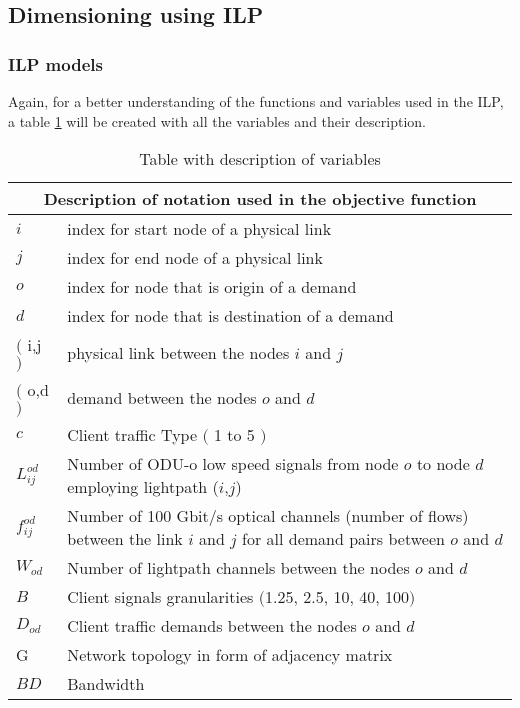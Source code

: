 \newpage
\subsection{Dimensioning using ILP}

\subsubsection{ILP models} \label{ILP_models_Transluc}

Again, for a better understanding of the functions and variables used in the ILP, a table \ref{description_transluc} will be created with all the variables and their description. \\

\begin{table}[h!]
\centering
\begin{tabular}{ |p{1cm}||p{13cm}|}
 \hline
 \multicolumn{2}{|c|}{Description of notation used in the objective function} \\
 \hline
 \hline
 $i$ & index for start node of a physical link \\
 $j$ & index for end node of a physical link \\
 $o$ & index for node that is origin of a demand \\
 $d$ & index for node that is destination of a demand \\
 $($ i,j $)$ & physical link between the nodes $i$ and $j$ \\
 $($ o,d $)$ & demand between the nodes $o$ and $d$ \\
 $c$ & Client traffic Type $($ 1 to 5 $)$ \\
 $L_{ij}^{od}$ & Number of ODU-o low speed signals from node $o$ to node $d$ employing lightpath ($i$,$j$) \\
 $f_{ij}^{od}$ & Number of 100 Gbit/s optical channels (number of flows) between the link $i$ and $j$ for all demand pairs between $o$ and $d$ \\
 $W_{od}$ & Number of lightpath channels between the nodes $o$ and $d$ \\
 $B$ & Client signals granularities $($1.25, 2.5, 10, 40, 100$)$ \\
 $D_{od}$ & Client traffic demands between the nodes $o$ and $d$ \\
 G & Network topology in form of adjacency matrix \\
 $BD$ & Bandwidth \\
 \hline
\end{tabular}
\caption{Table with description of variables}
\label{description_transluc}
\end{table}


